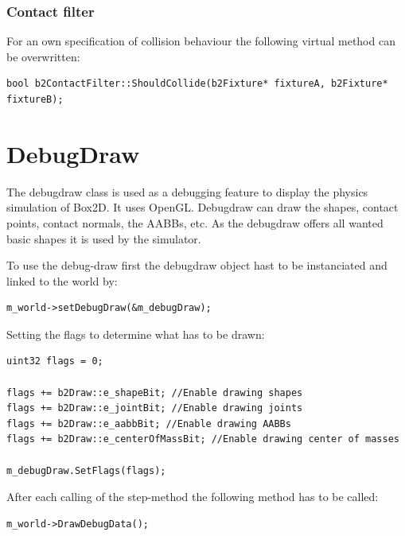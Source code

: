 \documentclass[10pt,a4paper,DIV=11]{scrreprt}
\begin{document}
\subsubsection*{Contact filter}
For an own specification of collision behaviour the following virtual method can be overwritten: \\
\begin{lstlisting}[caption={The contact filter method},label=lst:box2d-contactfiler]
bool b2ContactFilter::ShouldCollide(b2Fixture* fixtureA, b2Fixture* fixtureB);
\end{lstlisting}


\section{DebugDraw}
The debugdraw class is used as a debugging feature to display the physics simulation of Box2D. It uses OpenGL. Debugdraw can draw the shapes, contact points, contact normals, the AABBs, etc.
As the debugdraw offers all wanted basic shapes it is used by the simulator.

To use the debug-draw first the debugdraw object hast to be instanciated and linked to the world by: \\

\begin{lstlisting}[caption={Linking debugdraw instance to the world instance},label=lst:box2d-ddrawset]
m_world->setDebugDraw(&m_debugDraw);
\end{lstlisting}

Setting the flags to determine what has to be drawn:

\begin{lstlisting}[caption={Initializing DebugDraw},label=lst:box2d-ddrawinit]
uint32 flags = 0;

flags += b2Draw::e_shapeBit; //Enable drawing shapes
flags += b2Draw::e_jointBit; //Enable drawing joints
flags += b2Draw::e_aabbBit; //Enable drawing AABBs
flags += b2Draw::e_centerOfMassBit; //Enable drawing center of masses

m_debugDraw.SetFlags(flags);
\end{lstlisting}


After each calling of the step-method the following method has to be called: \\

\begin{lstlisting}[caption={Using debugdraw after each step},label=lst:box2d-ddraw]
m_world->DrawDebugData();
\end{lstlisting}
\end{document}

